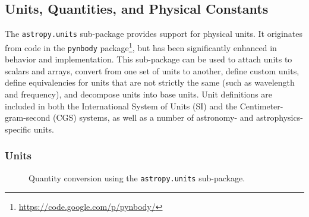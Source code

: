 \documentclass[traditabstract]{aa}
\begin{document}
\label{sec:capabilities}

\subsection{Units, Quantities, and Physical Constants}

\label{sec:units_main}


The \texttt{astropy.units} sub-package provides support for physical units. It
originates from code in the \texttt{pynbody}
package\footnote{\url{https://code.google.com/p/pynbody/}}, but has been
significantly enhanced in behavior and implementation. This sub-package can be
used to attach units to scalars and arrays, convert from one set of units to
another, define custom units, define equivalencies for units that are not
strictly the same (such as wavelength and frequency), and decompose units into
base units. Unit definitions are included in both the International System of
Units (SI) and the Centimeter-gram-second (CGS) systems, as well as a number of
astronomy- and astrophysics-specific units.

\subsubsection{Units}

\begin{figure}
\center
\caption{Quantity conversion using the \texttt{astropy.units} sub-package.\label{code:quantities}}
\vspace{0.1in}
\end{figure}
\label{sec:units}
\end{document}

